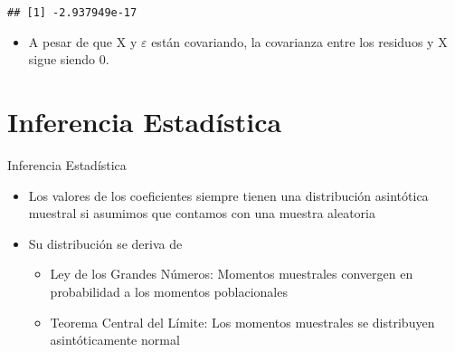 \documentclass[
  ignorenonframetext,
]{beamer}
\newenvironment{Shaded}{\begin{snugshade}}{\end{snugshade}}
\newcommand{\AttributeTok}[1]{\textcolor[rgb]{0.77,0.63,0.00}{#1}}
\newcommand{\FunctionTok}[1]{\textcolor[rgb]{0.00,0.00,0.00}{#1}}
\newcommand{\NormalTok}[1]{#1}
\newcommand{\OtherTok}[1]{\textcolor[rgb]{0.56,0.35,0.01}{#1}}
\newcommand{\SpecialCharTok}[1]{\textcolor[rgb]{0.00,0.00,0.00}{#1}}
\providecommand{\tightlist}{%
  \setlength{\itemsep}{0pt}\setlength{\parskip}{0pt}}
\begin{document}
\begin{frame}[fragile]{}
\protect\hypertarget{section-15}{}
\begin{Shaded}
\end{Shaded}

\begin{verbatim}
## [1] -2.937949e-17
\end{verbatim}

\begin{itemize}
\tightlist
\item
  A pesar de que X y \(\varepsilon\) están covariando, la covarianza
  entre los residuos y X sigue siendo 0.
\end{itemize}
\end{frame}

\hypertarget{inferencia-estaduxedstica}{%
\section{Inferencia Estadística}\label{inferencia-estaduxedstica}}

\begin{frame}{Inferencia Estadística}
\begin{itemize}
\item
  Los valores de los coeficientes siempre tienen una distribución
  asintótica muestral si asumimos que contamos con una muestra aleatoria
\item
  Su distribución se deriva de

  \begin{itemize}
  \tightlist
  \item
    Ley de los Grandes Números: Momentos muestrales convergen en
    probabilidad a los momentos poblacionales
  \item
    Teorema Central del Límite: Los momentos muestrales se distribuyen
    asintóticamente normal
  \end{itemize}
\end{itemize}
\end{frame}
\end{document}
